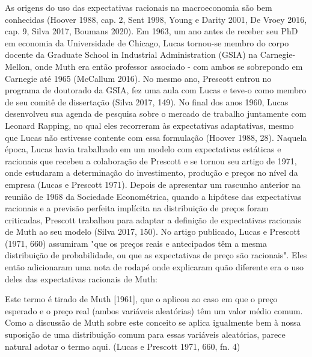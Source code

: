 \documentclass[a4paper,12pt]{article}[abntex2]
\begin{document}
As origens do uso das expectativas racionais na macroeconomia são bem conhecidas (Hoover 1988, cap. 2, Sent 1998, Young e Darity 2001, De Vroey 2016, cap. 9, Silva 2017, Boumans 2020). Em 1963, um ano antes de receber seu PhD em economia da Universidade de Chicago, Lucas tornou-se membro do corpo docente da Graduate School in Industrial Administration (GSIA) na Carnegie-Mellon, onde Muth era então professor associado - com ambos se sobrepondo em Carnegie até 1965 (McCallum 2016). No mesmo ano, Prescott entrou no programa de doutorado da GSIA, fez uma aula com Lucas e teve-o como membro de seu comitê de dissertação (Silva 2017, 149). No final dos anos 1960, Lucas desenvolveu sua agenda de pesquisa sobre o mercado de trabalho juntamente com Leonard Rapping, no qual eles recorreram às expectativas adaptativas, mesmo que Lucas não estivesse contente com essa formulação (Hoover 1988, 28). Naquela época, Lucas havia trabalhado em um modelo com expectativas estáticas e racionais que recebeu a colaboração de Prescott e se tornou seu artigo de 1971, onde estudaram a determinação do investimento, produção e preços no nível da empresa (Lucas e Prescott 1971). Depois de apresentar um rascunho anterior na reunião de 1968 da Sociedade Econométrica, quando a hipótese das expectativas racionais e a previsão perfeita implícita na distribuição de preços foram criticadas, Prescott trabalhou para adaptar a definição de expectativas racionais de Muth ao seu modelo (Silva 2017, 150). No artigo publicado, Lucas e Prescott (1971, 660) assumiram "que os preços reais e antecipados têm a mesma distribuição de probabilidade, ou que as expectativas de preço são racionais". Eles então adicionaram uma nota de rodapé onde explicaram quão diferente era o uso deles das expectativas racionais de Muth:

Este termo é tirado de Muth [1961], que o aplicou ao caso em que o preço esperado e o preço real (ambos variáveis aleatórias) têm um valor médio comum. Como a discussão de Muth sobre este conceito se aplica igualmente bem à nossa suposição de uma distribuição comum para essas variáveis aleatórias, parece natural adotar o termo aqui. (Lucas e Prescott 1971, 660, fn. 4)
\end{document}
